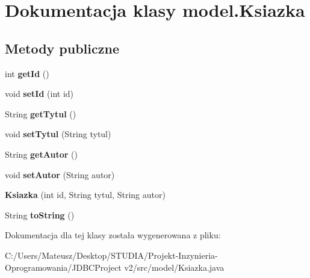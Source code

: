 \hypertarget{classmodel_1_1_ksiazka}{}\section{Dokumentacja klasy model.\+Ksiazka}
\label{classmodel_1_1_ksiazka}
\subsection*{Metody publiczne}
\begin{DoxyCompactItemize}
\item 
\hypertarget{classmodel_1_1_ksiazka_a7457258b6900580a2782d4a1f961d585}{}int {\bfseries get\+Id} ()\label{classmodel_1_1_ksiazka_a7457258b6900580a2782d4a1f961d585}

\item 
\hypertarget{classmodel_1_1_ksiazka_a299b97510c645087185b6f9a1ee63ff6}{}void {\bfseries set\+Id} (int id)\label{classmodel_1_1_ksiazka_a299b97510c645087185b6f9a1ee63ff6}

\item 
\hypertarget{classmodel_1_1_ksiazka_ab0eaf84ec1b2d7da641b5f8cc6379fa2}{}String {\bfseries get\+Tytul} ()\label{classmodel_1_1_ksiazka_ab0eaf84ec1b2d7da641b5f8cc6379fa2}

\item 
\hypertarget{classmodel_1_1_ksiazka_a143d2f509f17dfce2b52860ee703eb06}{}void {\bfseries set\+Tytul} (String tytul)\label{classmodel_1_1_ksiazka_a143d2f509f17dfce2b52860ee703eb06}

\item 
\hypertarget{classmodel_1_1_ksiazka_ae513998c41e1e3e0987c6305c660e1d3}{}String {\bfseries get\+Autor} ()\label{classmodel_1_1_ksiazka_ae513998c41e1e3e0987c6305c660e1d3}

\item 
\hypertarget{classmodel_1_1_ksiazka_ad31e02240487cea80ad86a1f8cf30f9c}{}void {\bfseries set\+Autor} (String autor)\label{classmodel_1_1_ksiazka_ad31e02240487cea80ad86a1f8cf30f9c}

\item 
\hypertarget{classmodel_1_1_ksiazka_af3da0dea16a09266879ed6884ec71b3f}{}{\bfseries Ksiazka} (int id, String tytul, String autor)\label{classmodel_1_1_ksiazka_af3da0dea16a09266879ed6884ec71b3f}

\item 
\hypertarget{classmodel_1_1_ksiazka_aaca5aa304ed7ffd753d2eda6ecfb12b4}{}String {\bfseries to\+String} ()\label{classmodel_1_1_ksiazka_aaca5aa304ed7ffd753d2eda6ecfb12b4}

\end{DoxyCompactItemize}


Dokumentacja dla tej klasy została wygenerowana z pliku\+:\begin{DoxyCompactItemize}
\item 
C\+:/\+Users/\+Mateusz/\+Desktop/\+S\+T\+U\+D\+I\+A/\+Projekt-\/\+Inzynieria-\/\+Oprogramowania/\+J\+D\+B\+C\+Project v2/src/model/Ksiazka.\+java\end{DoxyCompactItemize}
